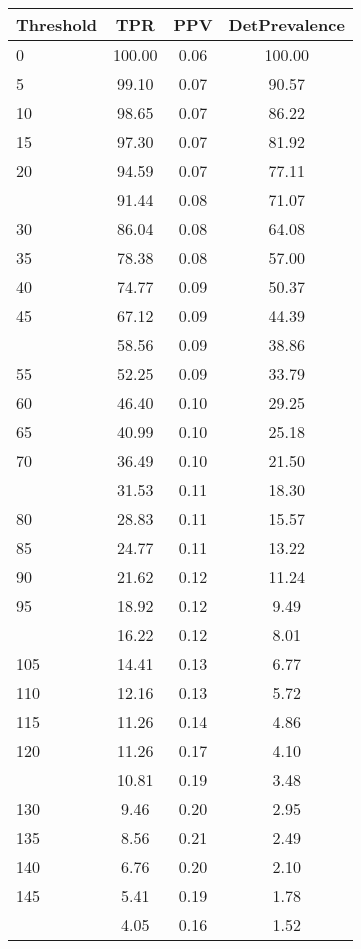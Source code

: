 \begin{table}[ht]
\centering
\begin{tabular}{lccc}
  \toprule
Threshold & TPR & PPV & DetPrevalence \\ 
  \midrule
0 & 100.00 & 0.06 & 100.00 \\ 
  5 & 99.10 & 0.07 & 90.57 \\ 
  10 & 98.65 & 0.07 & 86.22 \\ 
  15 & 97.30 & 0.07 & 81.92 \\ 
  20 & 94.59 & 0.07 & 77.11 \\ 
   \addlinespace
25 & 91.44 & 0.08 & 71.07 \\ 
  30 & 86.04 & 0.08 & 64.08 \\ 
  35 & 78.38 & 0.08 & 57.00 \\ 
  40 & 74.77 & 0.09 & 50.37 \\ 
  45 & 67.12 & 0.09 & 44.39 \\ 
   \addlinespace
50 & 58.56 & 0.09 & 38.86 \\ 
  55 & 52.25 & 0.09 & 33.79 \\ 
  60 & 46.40 & 0.10 & 29.25 \\ 
  65 & 40.99 & 0.10 & 25.18 \\ 
  70 & 36.49 & 0.10 & 21.50 \\ 
   \addlinespace
75 & 31.53 & 0.11 & 18.30 \\ 
  80 & 28.83 & 0.11 & 15.57 \\ 
  85 & 24.77 & 0.11 & 13.22 \\ 
  90 & 21.62 & 0.12 & 11.24 \\ 
  95 & 18.92 & 0.12 & 9.49 \\ 
   \addlinespace
100 & 16.22 & 0.12 & 8.01 \\ 
  105 & 14.41 & 0.13 & 6.77 \\ 
  110 & 12.16 & 0.13 & 5.72 \\ 
  115 & 11.26 & 0.14 & 4.86 \\ 
  120 & 11.26 & 0.17 & 4.10 \\ 
   \addlinespace
125 & 10.81 & 0.19 & 3.48 \\ 
  130 & 9.46 & 0.20 & 2.95 \\ 
  135 & 8.56 & 0.21 & 2.49 \\ 
  140 & 6.76 & 0.20 & 2.10 \\ 
  145 & 5.41 & 0.19 & 1.78 \\ 
   \addlinespace
150 & 4.05 & 0.16 & 1.52 \\ 

\end{tabular}
\end{table}
